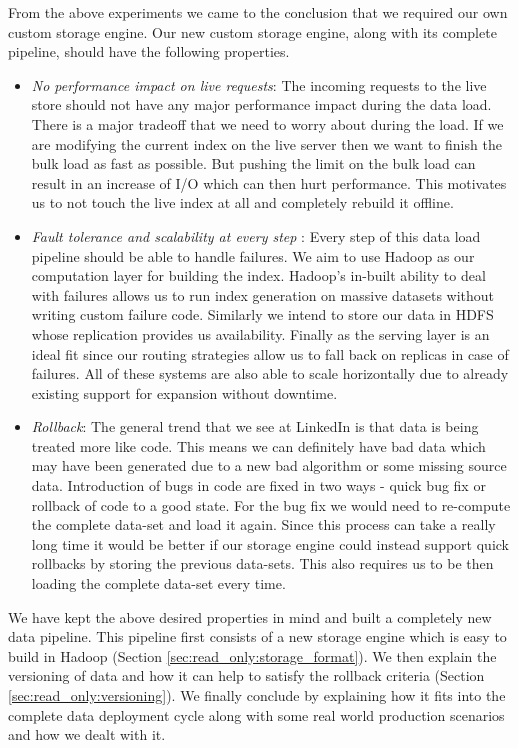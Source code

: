 \documentclass[10pt,twocolumn,preprint,natbib,authoryear]{sigplanconf}
\begin{document}
From the above experiments we came to the conclusion that we required our own custom storage engine. Our new custom storage engine, along with its complete pipeline, should have the following properties. 
\begin{itemize}
\item \emph {No performance impact on live requests}: The incoming requests to the live store should not have any major performance impact during the data load. There is a major tradeoff that we need to worry about during the load. If we are modifying the current index on the live server then we want to finish the bulk load as fast as possible. But pushing the limit on the bulk load can result in an increase of I/O which can then hurt performance. This motivates us to not touch the live index at all and completely rebuild it offline. 
\item \emph {Fault tolerance and scalability at every step }: Every step of this data load pipeline should be able to handle failures. We aim to use Hadoop as our computation layer for building the index. Hadoop's in-built ability to deal with failures allows us to run index generation on massive datasets without writing custom failure code. Similarly we intend to store our data in HDFS whose replication provides us availability. Finally \projectname{} as the serving layer is an ideal fit since our routing strategies allow us to fall back on replicas in case of failures. All of these systems are also able to scale horizontally due to already existing support for expansion without downtime. 
\item \emph{Rollback}: The general trend that we see at LinkedIn is that data is being treated more like code. This means we can definitely have bad data which may have been generated due to a new bad algorithm or some missing source data. Introduction of bugs in code are fixed in two ways - quick bug fix or rollback of code to a good state. For the bug fix we would need to re-compute the complete data-set and load it again. Since this process can take a really long time it would be better if our storage engine could instead support quick rollbacks by storing the previous data-sets. This also requires us to be then loading the complete data-set every time. 
\end{itemize}

We have kept the above desired properties in mind and built a completely new data pipeline. This pipeline first consists of a new storage engine which is easy to build in Hadoop (Section \ref{sec:read_only:storage_format}). We then explain the versioning of data and how it can help to satisfy the rollback criteria (Section \ref{sec:read_only:versioning}). We finally conclude by explaining how it fits into the complete data deployment cycle along with some real world production scenarios and how we dealt with it. 
\end{document}
